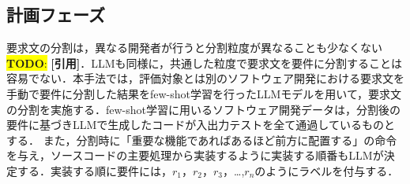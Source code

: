 \documentclass[submit,techrep,noauthor]{ipsj}
\newcommand{\todo}[1]{\colorbox{yellow}{{\bf TODO}:}{\color{red} {\textbf{[#1]}}}}
\begin{document}






\subsection{計画フェーズ}
要求文の分割は，異なる開発者が行うと分割粒度が異なることも少なくない\todo{引用}．LLMも同様に，共通した粒度で要求文を要件に分割することは容易でない．本手法では，評価対象とは別のソフトウェア開発における要求文を手動で要件に分割した結果をfew-shot学習を行ったLLMモデルを用いて，要求文の分割を実施する．few-shot学習に用いるソフトウェア開発データは，分割後の要件に基づきLLMで生成したコードが入出力テストを全て通過しているものとする．
また，分割時に「重要な機能であればあるほど前方に配置する」の命令を与え，ソースコードの主要処理から実装するように実装する順番もLLMが決定する．実装する順に要件には，$r_1$，$r_2$，$r_3$，\dots,$r_n$のようにラベルを付与する．
\end{document}
